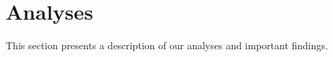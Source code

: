 \section{Analyses}
This section presents a description of our analyses and important findings.






